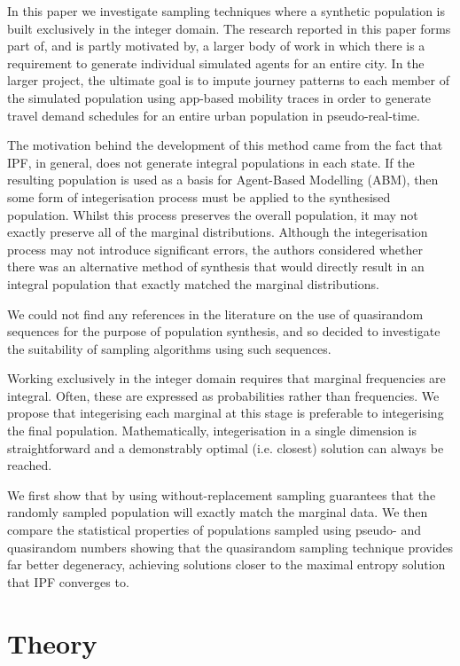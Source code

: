 \documentclass{JASSS}
\begin{document}
In this paper we investigate sampling techniques where a synthetic population is built exclusively in the integer domain. The research reported in this paper forms part of, and is partly motivated by, a larger body of work in which there is a requirement to generate individual simulated agents for an entire city. In the larger project, the ultimate goal is to impute journey patterns to each member of the simulated population using app-based mobility traces in order to generate travel demand schedules for an entire urban population in pseudo-real-time.

The motivation behind the development of this method came from the fact
that IPF, in general, does not generate integral populations in each
state. If the resulting population is used as a basis for Agent-Based
Modelling (ABM), then some form of integerisation process must be applied to the
synthesised population. Whilst this process preserves the overall
population, it may not exactly preserve all of the marginal
distributions. Although the integerisation process may not introduce significant errors, the
authors considered whether there was an alternative method of synthesis
that would directly result in an integral population that exactly
matched the marginal distributions.

We could not find any references in the literature on the use of
quasirandom sequences for the purpose of population synthesis, and so
decided to investigate the suitability of sampling algorithms using such
sequences.

Working exclusively in the integer domain requires that marginal frequencies are integral. Often, these are expressed as probabilities rather than frequencies. We propose that integerising each marginal at this stage is preferable to integerising the final population. Mathematically, integerisation in a single dimension is straightforward and a demonstrably optimal (i.e. closest) solution can always be reached.    

We first show that by using without-replacement sampling guarantees that the randomly sampled population will exactly match the marginal data. We then compare the statistical properties of populations sampled using pseudo- and quasirandom numbers showing that the quasirandom sampling technique provides far better degeneracy, achieving solutions closer to the maximal entropy solution that IPF converges to.

\section{Theory}\label{theory}
\end{document}
